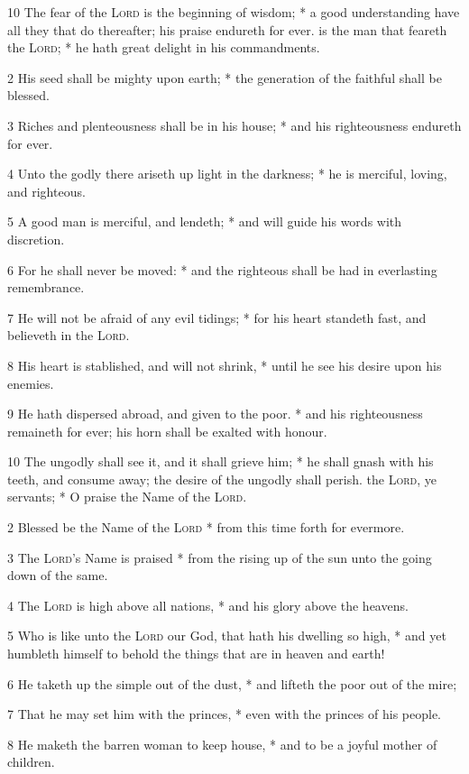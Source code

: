 10 The fear of the {\textsc{Lord}} is the beginning of wisdom; * a good understanding have all they that do thereafter; his praise endureth for ever.
 is the man that feareth the {\textsc{Lord}}; * he hath great delight in his commandments.\par
2 His seed shall be mighty upon earth; * the generation of the faithful shall be blessed.\par
3 Riches and plenteousness shall be in his house; * and his righteousness endureth for ever.\par
4 Unto the godly there ariseth up light in the darkness; * he is merciful, loving, and righteous.\par
5 A good man is merciful, and lendeth; * and will guide his words with discretion.\par
6 For he shall never be moved: * and the righteous shall be had in everlasting remembrance.\par
7 He will not be afraid of any evil tidings; * for his heart standeth fast, and believeth in the {\textsc{Lord}}.\par
8 His heart is stablished, and will not shrink, * until he see his desire upon his enemies.\par
9 He hath dispersed abroad, and given to the poor. * and his righteousness remaineth for ever; his horn shall be exalted with honour.\par
10 The ungodly shall see it, and it shall grieve him; * he shall gnash with his teeth, and consume away; the desire of the ungodly shall perish.
 the {\textsc{Lord}}, ye servants; * O praise the Name of the {\textsc{Lord}}.\par
2 Blessed be the Name of the {\textsc{Lord}} * from this time forth for evermore.\par
3 The {\textsc{Lord}}'s Name is praised * from the rising up of the sun unto the going down of the same.\par
4 The {\textsc{Lord}} is high above all nations, * and his glory above the heavens.\par
5 Who is like unto the {\textsc{Lord}} our God, that hath his dwelling so high, * and yet humbleth himself to behold the things that are in heaven and earth!\par
6 He taketh up the simple out of the dust, * and lifteth the poor out of the mire;\par
7 That he may set him with the princes, * even with the princes of his people.\par
8 He maketh the barren woman to keep house, * and to be a joyful mother of children.
